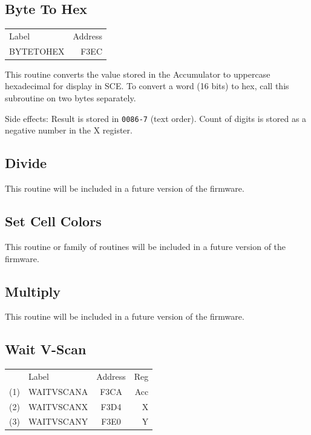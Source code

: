 \documentclass[12pt]{{memoir}}
\begin{document}
\subsection{Byte To Hex}

\begin{center}\begin{tabular}{>{\ttfamily}l>{\ttfamily}r}
\textrm{Label} & \textrm{Address} \\
BYTETOHEX & F3EC \\
\end{tabular}\end{center}

This routine converts the value stored in the Accumulator to uppercase hexadecimal for display in SCE. To convert a word (16 bits) to hex, call this subroutine on two bytes separately.

Side effects: Result is stored in \texttt{0086-7} (text order). Count of digits is stored as a negative number in the X register.

\subsection{Divide}

This routine will be included in a future version of the firmware.

\subsection{Set Cell Colors}

This routine or family of routines will be included in a future version of the firmware.

\subsection{Multiply}

This routine will be included in a future version of the firmware.

\subsection{Wait V-Scan}

\begin{center}\begin{tabular}{r>{\ttfamily}l>{\ttfamily}cr}
& \textrm{Label} & \textrm{Address} & Reg \\
(1) & WAITVSCANA & F3CA & Acc \\
(2) & WAITVSCANX & F3D4 & X \\
(3) & WAITVSCANY & F3E0 & Y \\
\end{tabular}\end{center}
\end{document}
